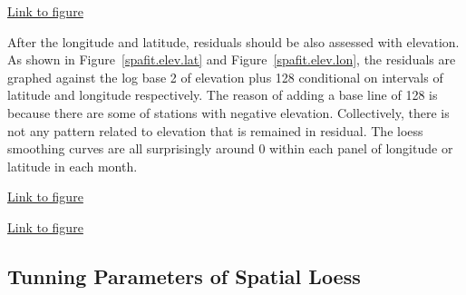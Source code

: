\begin{framed}
\begin{center}
  \href{../plots/a1950/spafit/d2/span0.015/a1950.spaResid.vs.lat.lon.pdf}
  {Link to figure}
  \label{spafit.lat.lon}
\end{center}
\end{framed}

After the longitude and latitude, residuals should be also assessed with elevation.
As shown in 
Figure~\href{../plots/a1950/spafit/d2/span0.015/a1950.spaResid.vs.elev.lat.pdf}
{\ref*{spafit.elev.lat}} and 
Figure~\href{../plots/a1950/spafit/d2/span0.015/a1950.spaResid.vs.elev.lon.pdf}
{\ref*{spafit.elev.lon}}, the residuals are graphed against the log base 2 of
elevation plus 128 conditional on intervals of latitude and longitude respectively.
The reason of adding a base line of 128 is because there are some of stations 
with negative elevation. Collectively, there is not any pattern related to elevation
that is remained in residual. The loess smoothing curves are all surprisingly 
around 0 within each panel of longitude or latitude in each month.



\begin{framed}
\begin{center}
  \href{../plots/a1950/spafit/d2/span0.015/a1950.spaResid.vs.elev.lat.pdf}
  {Link to figure}
  \label{spafit.elev.lat}
\end{center}
\end{framed}

\begin{framed}
\begin{center}
  \href{../plots/a1950/spafit/d2/span0.015/a1950.spaResid.vs.elev.lon.pdf}
  {Link to figure}
  \label{spafit.elev.lon}
\end{center}
\end{framed}

\subsection{Tunning Parameters of Spatial Loess}

